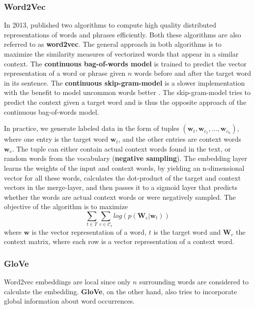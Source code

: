 \subsubsection{Word2Vec}\label{c:word2vec}
  In 2013, \citeauthor{Mikolov2013} published two algorithms to compute high quality distributed representations of words and phrases efficiently.
  Both these algorithms are also referred to as \textbf{word2vec}.
  The general approach in both algorithms is to maximize the similarity measures of vectorized words that appear in a similar context.
  The \textbf{continuous bag-of-words model} is trained to predict the vector representation of a word or phrase given $n$ words before and after the target word in its sentence.
  The \textbf{continuous skip-gram-model} is a slower implementation with the benefit to model uncommon words better \citep{word2vec}.
  The skip-gram-model tries to predict the context given a target word and is thus the opposite approach of the continuous bag-of-words model.

  In practice, we generate labeled data in the form of tuples $(\mathbf{w}_t, \mathbf{w}_{c_{1}}, \dots, \mathbf{w}_{c_{n}})$, where one entry is the target word $\mathbf{w}_t$, and the other entries are context words $\mathbf{w}_c$.
  The tuple can either contain actual context words found in the text, or random words from the vocabulary (\textbf{negative sampling}).
  The embedding layer learns the weights of the input and context words, by yielding an n-dimensional vector for all these words, calculates the dot-product of the target and context vectors in the merge-layer, and then passes it to a sigmoid layer that predicts whether the words are actual context words or were negatively sampled.
  The objective of the algorithm is to maximize
  \[\sum_{t \in T} \sum_{c \in \mathcal{C}_t} log( p(\mathbf{W}_c|\mathbf{w}_t))\]
  where $\mathbf{w}$ is the vector representation of a word, $t$ is the target word and $\mathbf{W}_c$ the context matrix, where each row is a vector representation of a context word.

\subsubsection{GloVe}\label{c:glove}
  Word2vec embeddings are local since only $n$ surrounding words are considered to calculate the embedding.
  \textbf{GloVe}, on the other hand, also tries to incorporate global information about word occurrences.

